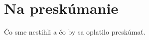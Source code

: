 \chapter{Na preskúmanie}
\label{chap:future-works}
{\color{red} Čo sme nestihli a čo by sa oplatilo preskúmať.}